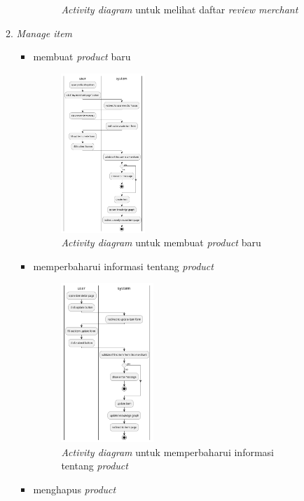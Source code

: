 \documentclass[a4paper]{article}
\begin{document}
\begin{enumerate}
\begin{enumerate}
\begin{itemize}
\begin{figure}[h]
                \caption{\textit{Activity diagram} untuk melihat daftar \textit{review merchant} }
            \end{figure}
        \end{itemize}

        \item \textit{Manage item}
        \begin{itemize}
            \item membuat \textit{product} baru
            \begin{figure}[h]
                \centering
                \includegraphics*[height=6cm]{./diagram/activity diagram/17. item/create item/create item.png}
                \caption{\textit{Activity diagram} untuk membuat \textit{product} baru}
            \end{figure}
            \newpage
            \item memperbaharui informasi tentang \textit{product}
            \begin{figure}[h]
                \centering
                \includegraphics*[height=6cm]{./diagram/activity diagram/17. item/update item/update item.png}
                \caption{\textit{Activity diagram} untuk memperbaharui informasi tentang \textit{product}}
            \end{figure}
            \item menghapus \textit{product}

\end{itemize}
\end{enumerate}
\end{enumerate}
\end{document}
